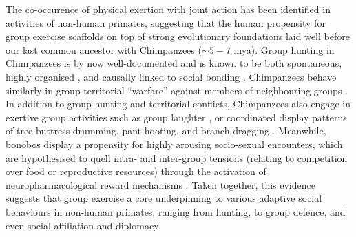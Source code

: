 \begin{CJK}{UTF8}{gbsn}
The co-occurence of physical exertion with joint action has been identified in activities of non-human primates, suggesting that the human propensity for group exercise scaffolds on top of strong evolutionary foundations laid well before our last common ancestor with Chimpanzees ($\sim 5-7$ mya).  Group hunting in Chimpanzees is by now well-documented and is known to be both spontaneous, highly organised \citep[for example involving divisions of set roles][]{Boesch1989}, and causally linked to social bonding \citep{Mitani2001}.  Chimpanzees behave similarly in group territorial ``warfare'' against members of neighbouring groups \citep{Boehm1992,Wilson2014a}.
In addition to group hunting and territorial conflicts, Chimpanzees also engage in exertive group activities such as group laughter \citep{Waller2005}, or coordinated display patterns of tree buttress drumming, pant-hooting, and branch-dragging \citep[for example, observed as part of a ``rain dance,'' see][]{Goodall2000,Whiten2001}.  Meanwhile, bonobos display a propensity for highly arousing socio-sexual encounters, which are hypothesised to quell intra- and inter-group tensions (relating to competition over food or reproductive resources) through the activation of neuropharmacological reward mechanisms \citep{Dunbar1992,Parr2005,Clay2015}.  Taken together, this evidence suggests that group exercise a core underpinning to various adaptive social behaviours in non-human primates, ranging from hunting, to group defence, and even social affiliation and diplomacy.


\end{CJK}
